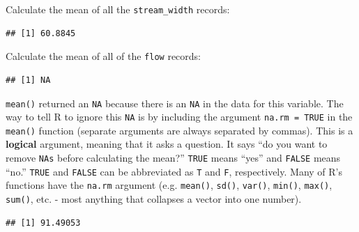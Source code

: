 \documentclass[]{book}
\newenvironment{Shaded}{\begin{snugshade}}{\end{snugshade}}
\newcommand{\KeywordTok}[1]{\textcolor[rgb]{0.13,0.29,0.53}{\textbf{#1}}}
\newcommand{\DataTypeTok}[1]{\textcolor[rgb]{0.13,0.29,0.53}{#1}}
\newcommand{\OperatorTok}[1]{\textcolor[rgb]{0.81,0.36,0.00}{\textbf{#1}}}
\newcommand{\NormalTok}[1]{#1}
\theoremstyle{definition}
\theoremstyle{definition}
\theoremstyle{definition}
\theoremstyle{remark}
\begin{document}
Calculate the mean of all the \texttt{stream\_width} records:

\begin{Shaded}
\end{Shaded}

\begin{verbatim}
## [1] 60.8845
\end{verbatim}

Calculate the mean of all of the \texttt{flow} records:

\begin{Shaded}
\end{Shaded}

\begin{verbatim}
## [1] NA
\end{verbatim}

\texttt{mean()} returned an \texttt{NA} because there is an \texttt{NA}
in the data for this variable. The way to tell R to ignore this
\texttt{NA} is by including the argument \texttt{na.rm\ =\ TRUE} in the
\texttt{mean()} function (separate arguments are always separated by
commas). This is a \textbf{logical} argument, meaning that it asks a
question. It says ``do you want to remove \texttt{NAs} before
calculating the mean?'' \texttt{TRUE} means ``yes'' and \texttt{FALSE}
means ``no.'' \texttt{TRUE} and \texttt{FALSE} can be abbreviated as
\texttt{T} and \texttt{F}, respectively. Many of R's functions have the
\texttt{na.rm} argument (e.g. \texttt{mean()}, \texttt{sd()},
\texttt{var()}, \texttt{min()}, \texttt{max()}, \texttt{sum()}, etc. -
most anything that collapses a vector into one number).

\begin{Shaded}
\end{Shaded}

\begin{verbatim}
## [1] 91.49053
\end{verbatim}
\end{document}
